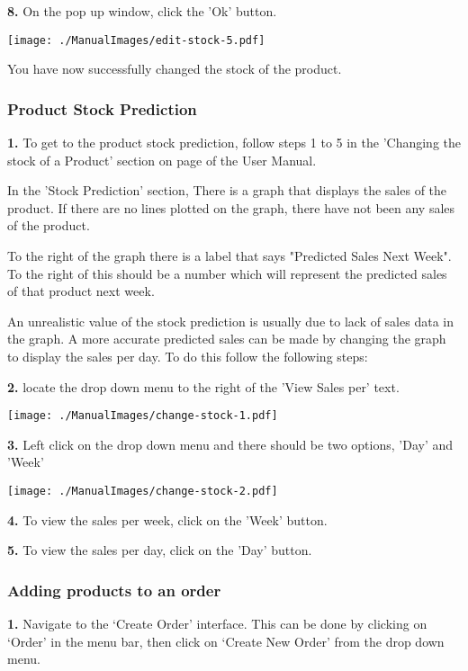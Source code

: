 \textbf{8.} On the pop up window, click the 'Ok' button.

\texttt{[image: ./ManualImages/edit-stock-5.pdf]}

You have now successfully changed the stock of the product.


\pagebreak
\subsubsection{Product Stock Prediction}
\label{fig:Product Stock Prediction}

\textbf{1.} To get to the product stock prediction, follow steps 1 to 5 in the 'Changing the stock of a Product' section on page \pageref{fig:Changing the stock of a Product} of the User Manual.

In the 'Stock Prediction' section, There is a graph that displays the sales of the product. If there are no lines plotted on the graph, there have not been any sales of the product.

To the right of the graph there is a label that says "Predicted Sales Next Week". To the right of this should be a number which will represent the predicted sales of that product next week.

An unrealistic value of the stock prediction is usually due to lack of sales data in the graph. A more accurate predicted sales can be made by changing the graph to display the sales per day. To do this follow the following steps:

\textbf{2.} locate the drop down menu to the right of the 'View Sales per' text.

\texttt{[image: ./ManualImages/change-stock-1.pdf]}

\textbf{3.} Left click on the drop down menu and there should be two options, 'Day' and 'Week'

\texttt{[image: ./ManualImages/change-stock-2.pdf]}

\textbf{4.} To view the sales per week, click on the 'Week' button.

\textbf{5.} To view the sales per day, click on the 'Day' button.

\pagebreak
\subsubsection{Adding products to an order}
\label{fig:Adding products to an order}

\textbf{1.} Navigate to the `Create Order' interface. This can be done by clicking on `Order' in the menu bar, then click on `Create New Order' from the drop down menu.


